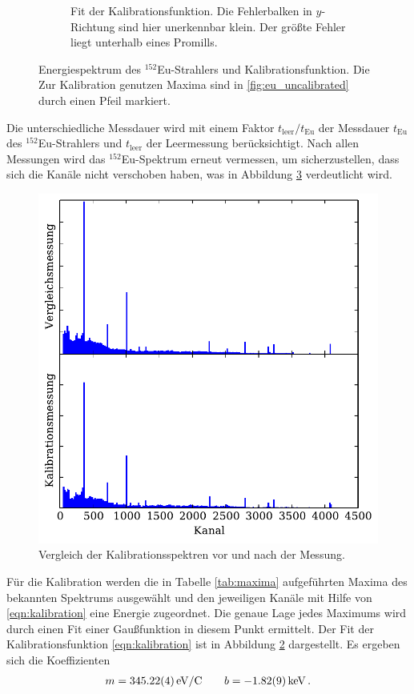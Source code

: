 \begin{figure}[htb]
\begin{subfigure}{.49\linewidth}
        \caption{
            Fit der Kalibrationsfunktion. Die Fehlerbalken in $y$-Richtung
            sind hier unerkennbar klein. Der größte Fehler liegt
            unterhalb eines Promills.
        }
        \label{fig:calibration}
    \end{subfigure}
    \caption{
        Energiespektrum des $^{152}$Eu-Strahlers und Kalibrationsfunktion.
        Die Zur Kalibration genutzen Maxima sind in \ref{fig:eu_uncalibrated}
        durch einen Pfeil markiert.
    }
\end{figure}
Die unterschiedliche Messdauer wird mit einem Faktor $t_\text{leer} / t_\text{Eu}$
der Messdauer $t_\text{Eu}$ des $^{152}$Eu-Strahlers und $t_\text{leer}$ der
Leermessung berücksichtigt.
Nach allen Messungen wird das $^{152}$Eu-Spektrum erneut vermessen,
um sicherzustellen, dass sich die Kanäle nicht verschoben haben, was in Abbildung
\ref{fig:control} verdeutlicht wird.
\begin{figure}
    \centering
    \includegraphics[width=0.7\linewidth]{img/01_comp.pdf}
    \caption{
        Vergleich der Kalibrationsspektren vor und nach der Messung.
    }
    \label{fig:control}
\end{figure}
Für die Kalibration werden die in Tabelle \ref{tab:maxima} aufgeführten
Maxima des bekannten Spektrums ausgewählt und den jeweiligen Kanäle mit
Hilfe von \eqref{eqn:kalibration} eine Energie zugeordnet.
Die genaue Lage jedes Maximums wird durch einen Fit einer Gaußfunktion in diesem
Punkt ermittelt.
Der Fit der Kalibrationsfunktion \eqref{eqn:kalibration} ist in Abbildung \ref{fig:calibration}
dargestellt. Es ergeben sich die Koeffizienten
%
\begin{align*}
     m = \SI{345.22+-0.04}{eV/C} \qquad b = \SI{-1.82+-0.09}{keV} \,.
\end{align*}
